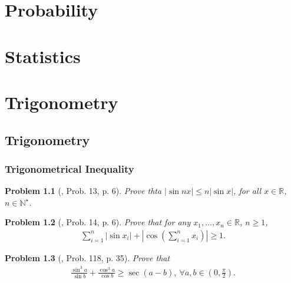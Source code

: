 \documentclass[oneside]{book}
\numberwithin{equation}{section}
\newtheorem{problem}{Problem}[section]
\begin{document}

\part{Probability}


\part{Statistics}


\part{Trigonometry}

\chapter{Trigonometry}

\section{Trigonometrical Inequality}

\begin{problem}[\cite{Gelca_Andreescu2017}, Prob. 13, p. 6]
	Prove thta $|\sin nx|\le n|\sin x|$, for all $x\in\mathbb{R}$, $n\in\mathbb{N}^\star$.
\end{problem}

\begin{problem}[\cite{Gelca_Andreescu2017}, Prob. 14, p. 6]
	Prove that for any $x_1,\ldots,x_n\in\mathbb{R}$, $n\ge 1$,
	\begin{align*}
		\sum_{i=1}^n |\sin x_i| + \left|\cos\left(\sum_{i=1}^n x_i\right)\right|\ge 1.
	\end{align*}
\end{problem}

\begin{problem}[\cite{Gelca_Andreescu2017}, Prob. 118, p. 35]
	Prove that
	\begin{align*}
		\frac{\sin^3 a}{\sin b} + \frac{\cos^3 a}{\cos b}\ge\sec(a - b),\ \forall a,b\in\left(0,\frac{\pi}{2}\right).
	\end{align*}
\end{problem}
\end{document}
